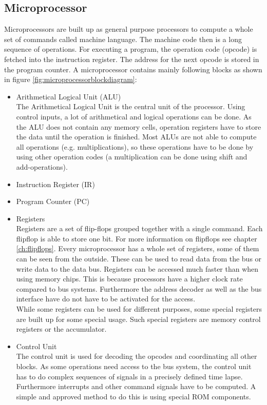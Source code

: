 \subsection{Microprocessor}
Microprocessors are built up as general purpose processors to compute a whole set of commands called machine language. The machine code then is a long sequence of operations. For executing a program, the operation code (opcode) is fetched into the instruction register. The address for the next opcode is stored in the program counter. A microprocessor contains mainly following blocks as shown in figure \ref{fig:microprocessorblockdiagram}:
\begin{itemize}
\item Arithmetical Logical Unit (ALU)\\
The Arithmetical Logical Unit is the central unit of the processor. Using control inputs, a lot of arithmetical and logical operations can be done. As the ALU does not contain any memory cells, operation registers have to store the data until the operation is finished. Most ALUs are not able to compute all operations (e.g. multiplications), so these operations have to be done by using other operation codes (a multiplication can be done using shift and add-operations). 
\item Instruction Register (IR)
\item Program Counter (PC)
\item Registers\\
Registers are a set of flip-flops grouped together with a single command. Each flipflop is able to store one bit. For more information on flipflops see chapter \ref{ch:flipflops}. Every microprocessor has a whole set of registers, some of them can be seen from the outside. These can be used to read data from the bus or write data to the data bus. Registers can be accessed much faster than when using memory chips. This is because processors have a higher clock rate compared to bus systems. Furthermore the address decoder as well as the bus interface have do not have to be activated for the access.\\
While some registers can be used for different purposes, some special registers are built up for some special usage. Such special registers are memory control registers or the accumulator. 
\item Control Unit\\
The control unit is used for decoding the opcodes and coordinating all other blocks. As some operations need access to the bus system, the control unit has to do complex sequences of signals in a precisely defined time lapse. Furthermore interrupts and other command signals have to be computed. A simple and approved method to do this is using special ROM components.\cite{Wue06}\\

\end{itemize}
